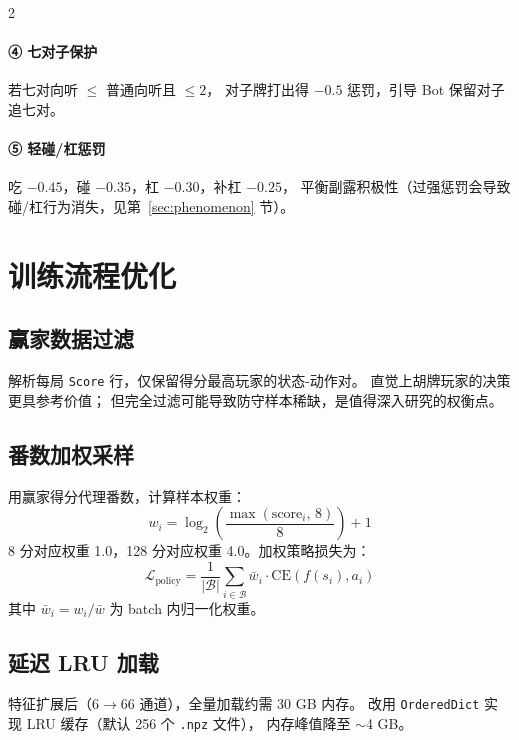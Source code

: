 \documentclass{article}
\newcommand{\calL}{\mathcal{L}}
\newcommand{\calB}{\mathcal{B}}
\begin{document}
\begin{multicols}{2}
\paragraph{④ 七对子保护}
若七对向听 $\leq$ 普通向听且 $\leq 2$，
对子牌打出得 $-0.5$ 惩罚，引导 Bot 保留对子追七对。

\paragraph{⑤ 轻碰/杠惩罚}
吃 $-0.45$，碰 $-0.35$，杠 $-0.30$，补杠 $-0.25$，
平衡副露积极性（过强惩罚会导致碰/杠行为消失，见第~\ref{sec:phenomenon} 节）。

\section{训练流程优化}
\label{sec:training}

\subsection{赢家数据过滤}

解析每局 \texttt{Score} 行，仅保留得分最高玩家的状态-动作对。
直觉上胡牌玩家的决策更具参考价值；
但完全过滤可能导致防守样本稀缺，是值得深入研究的权衡点。

\subsection{番数加权采样}

用赢家得分代理番数，计算样本权重：
\begin{equation}
w_i = \log_2\!\left(\frac{\max(\text{score}_i,\,8)}{8}\right) + 1
\end{equation}
8 分对应权重 1.0，128 分对应权重 4.0。加权策略损失为：
\begin{equation}
\calL_{\text{policy}}
= \frac{1}{|\calB|}\sum_{i\in\calB} \bar{w}_i \cdot \text{CE}(f(s_i),a_i)
\label{eq:weighted_loss}
\end{equation}
其中 $\bar{w}_i = w_i / \bar{w}$ 为 batch 内归一化权重。

\subsection{延迟 LRU 加载}

特征扩展后（6$\to$66 通道），全量加载约需 30 GB 内存。
改用 \texttt{OrderedDict} 实现 LRU 缓存（默认 256 个 \texttt{.npz} 文件），
内存峰值降至 $\sim$4 GB。


\end{multicols}
\end{document}
